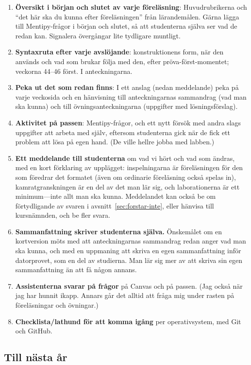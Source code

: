 \documentclass[a4paper]{article}
\begin{document}
\begin{refsection}
\begin{enumerate}
\item \textbf{Översikt i början och slutet av varje föreläsning}:
  Huvudrubrikerna och \enquote{det här ska du kunna efter föreläsningen}
  från lärandemålen.
  Gärna lägga till Mentipy-frågor i början och slutet, så att
  studenterna själva ser vad de redan kan.
  Signalera övergångar lite tydligare muntligt.
\item \textbf{Syntaxruta efter varje avslöjande}: konstruktionens form,
  när den används och vad som brukar följa med den, efter
  pröva-först-momentet; veckorna 44--46 först.
  I anteckningarna.
\item \textbf{Peka ut det som redan finns}: I ett anslag (nedan meddelande) 
  peka på varje veckosida och en hänvisning till anteckningarnas sammandrag 
  (vad man ska kunna) och till övningsanteckningarna (uppgifter med 
  lösningsförslag).
\item \textbf{Aktivitet på passen}: Mentipy-frågor, och ett nytt försök
  med andra slags uppgifter att arbeta med själv, eftersom studenterna
  gick när de fick ett problem att lösa på egen hand.
  (De ville hellre jobba med labben.)
\item \textbf{Ett meddelande till studenterna} om vad vi hört och vad som
  ändras, med en kort förklaring av upplägget: inspelningarna är
  föreläsningen för den som föredrar det formatet (även om ordinarie 
  föreläsning också spelas in), kamratgranskningen är en del
  av det man lär sig, och laborationerna är ett minimum---inte allt man
  ska kunna. Meddelandet kan också be om förtydligande av svaren i
  avsnitt~\ref{sec:forstar-inte}, eller hänvisa till kursnämnden, och
  be fler svara.
\item \textbf{Sammanfattning skriver studenterna själva.} Önskemålet om en
  kortversion möts med att anteckningarnas sammandrag redan anger vad man
  ska kunna, och med en uppmaning att skriva en egen sammanfattning inför
  datorprovet, som en del av studierna.
  Man lär sig mer av att skriva sin egen sammanfattning än att få någon annans.
\item \textbf{Assistenterna svarar på frågor} på Canvas och på passen.
  (Jag också när jag har hunnit ikapp. Annars går det alltid att fråga mig 
  under rasten på föreläsningar och övningar.)
\item \textbf{Checklista/lathund för att komma igång} per operativsystem, med 
  Git och GitHub.
\end{enumerate}

\subsection{Till nästa år}


\end{refsection}
\end{document}
